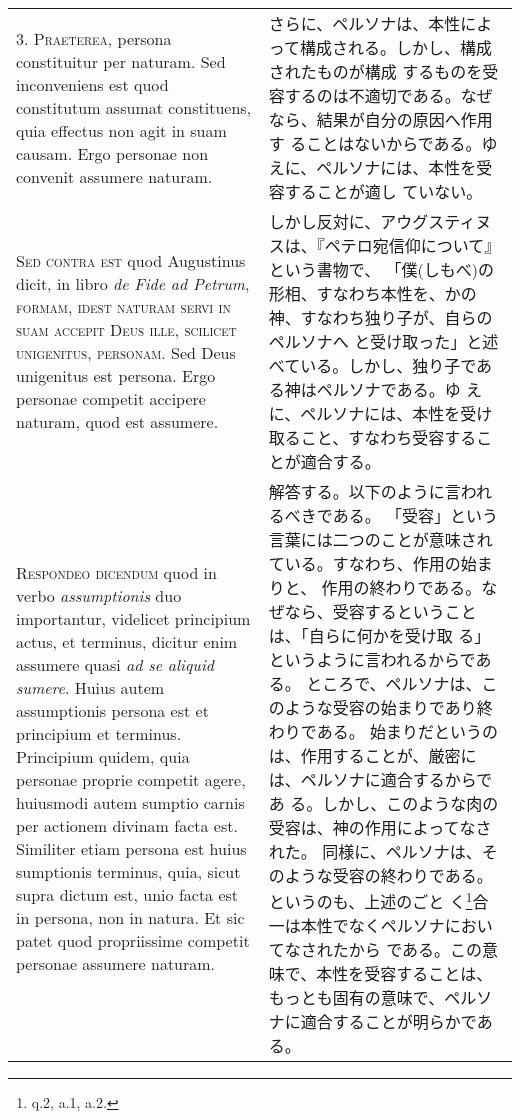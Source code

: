 \documentclass[10pt]{jsarticle} %
\begin{document}
\begin{longtable}{p{21em}p{21em}}
3. {\scshape Praeterea}, persona constituitur per naturam. Sed inconveniens est quod
constitutum assumat constituens, quia effectus non agit in suam
causam. Ergo personae non convenit assumere naturam.


&


さらに、ペルソナは、本性によって構成される。しかし、構成されたものが構成
 するものを受容するのは不適切である。なぜなら、結果が自分の原因へ作用す
 ることはないからである。ゆえに、ペルソナには、本性を受容することが適し
 ていない。

\\



{\scshape Sed contra est} quod Augustinus dicit, in libro {\itshape de Fide ad Petrum},
{\scshape formam, idest naturam servi in suam accepit Deus ille, scilicet
unigenitus, personam}. Sed Deus unigenitus est persona. Ergo personae
competit accipere naturam, quod est assumere.



&

しかし反対に、アウグスティヌスは、『ペテロ宛信仰について』という書物で、
 「僕(しもべ)の形相、すなわち本性を、かの神、すなわち独り子が、自らのペルソナへ
 と受け取った」と述べている。しかし、独り子である神はペルソナである。ゆ
 えに、ペルソナには、本性を受け取ること、すなわち受容することが適合する。

\\


{\scshape Respondeo dicendum} quod in verbo {\itshape assumptionis} duo importantur, videlicet
principium actus, et terminus, dicitur enim assumere quasi {\itshape ad se aliquid
sumere}. Huius autem assumptionis persona est et principium et
terminus. Principium quidem, quia personae proprie competit agere,
huiusmodi autem sumptio carnis per actionem divinam facta est. Similiter
etiam persona est huius sumptionis terminus, quia, sicut supra dictum
est, unio facta est in persona, non in natura. Et sic patet quod
propriissime competit personae assumere naturam.


&

解答する。以下のように言われるべきである。
「受容」という言葉には二つのことが意味されている。すなわち、作用の始まりと、
 作用の終わりである。なぜなら、受容するということは、「自らに何かを受け取
 る」というように言われるからである。
ところで、ペルソナは、このような受容の始まりであり終わりである。
始まりだというのは、作用することが、厳密には、ペルソナに適合するからであ
 る。しかし、このような肉の受容は、神の作用によってなされた。
同様に、ペルソナは、そのような受容の終わりである。というのも、上述のごと
 く\footnote{q.2, a.1, a.2.}合一は本性でなくペルソナにおいてなされたから
 である。この意味で、本性を受容することは、もっとも固有の意味で、ペルソ
 ナに適合することが明らかである。



\end{longtable}
\end{document}
